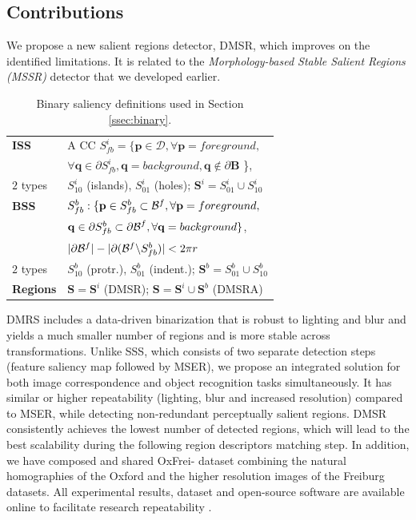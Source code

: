 \documentclass[conference,compsoc]{IEEEtran}
\def\B{{\mathbf B}}
\def\mcD{{\mathcal{D}}}
\def\p{{\mathbf p}}
\def\q{{\mathbf q}}
\def\S{{\mathbf S}}
\begin{document}
\subsection{Contributions}
We propose a new salient regions detector, DMSR, which improves on the identified limitations. It is related to the {\em Morphology-based Stable Salient Regions (MSSR)} detector that we developed earlier\cite{RangMSSR06, RangHumpb06}. 
\begin{table}[hbt]
\caption{Binary saliency definitions used in Section \ref{ssec:binary}.}\label{table:binary_sal}
\begin{minipage}[b]{0.99\linewidth}\begin{tabular}{|l l|}
\hline
{\bf ISS} & A CC $S^i_{fb} = \{\p \in \mcD, \forall \p=foreground,$\\&$\forall \q \in \partial S^i_{fb}, \q=background, \q \notin \partial \B $ \},\\
$2$ types & $S^i_{10}$ (islands), $S^i_{01}$  (holes); $\S^i = S_{01}^i \cup S_{10}^i$\\
{\bf BSS} &  $S_{fb}^b: \{\p \in S_{fb}^b \subset{\cal B}^f, \forall \p = foreground,$\\&$ \q \in \partial S_{fb}^b \subset {\partial \cal B}^f,\forall \q = background \}$, \\
& $|\partial {\cal B}^f| - |\partial ({\cal B}^f \backslash S_{fb}^b)| < 2 \pi r$\\
$2$ types & $S^b_{10}$ (protr.), $S^b_{01}$ (indent.); $\S^b = S_{01}^b \cup S_{10}^b$\\
{\bf Regions} &  $\S = \S^i$ (DMSR); $\S = \S^i \cup \S^b$ (DMSRA)  \\
\hline
\end{tabular}
\centering
\end{minipage}
\end{table}


DMRS includes a data-driven binarization that is robust to lighting and blur and yields a much smaller number of regions and is more stable across transformations. Unlike SSS, which consists of two separate detection steps (feature saliency map followed by MSER), we propose an integrated solution for both image correspondence and object recognition tasks simultaneously. It has similar or higher  repeatability (lighting, blur and increased resolution) compared to MSER, while detecting non-redundant perceptually salient regions. DMSR consistently achieves the lowest number of detected regions, which will lead to the best scalability during the following region descriptors matching step.  In addition, we have composed and shared OxFrei- dataset combining the natural homographies of the Oxford and the higher resolution images of the Freiburg datasets. All experimental results, dataset and open-source software are available online to facilitate research repeatability \cite{elena_ranguelova_2016_45156}. 
\end{document}
